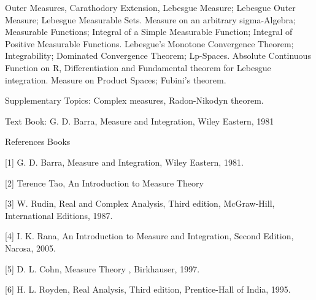 Outer Measures, Carathodory Extension, Lebesgue Measure; Lebesgue Outer Measure; Lebesgue Measurable Sets. Measure on an arbitrary sigma-Algebra; Measurable Functions; Integral of a Simple Measurable Function; Integral of Positive Measurable Functions. Lebesgue’s Monotone Convergence Theorem; Integrability; Dominated Convergence Theorem; Lp-Spaces. Absolute Continuous Function on R, Differentiation and Fundamental theorem for Lebesgue integration. Measure on Product Spaces;  Fubini’s theorem. 

Supplementary Topics: Complex measures, Radon-Nikodyn theorem.

Text Book: G. D. Barra, Measure and Integration, Wiley Eastern, 1981

References Books 

[1] G. D. Barra, Measure and Integration, Wiley Eastern, 1981. 

[2] Terence Tao, An Introduction to Measure Theory 

[3] W. Rudin, Real and Complex Analysis, Third edition, McGraw-Hill, International Editions, 1987.

[4] I. K. Rana, An Introduction to Measure and Integration, Second Edition, Narosa, 2005. 

[5] D. L. Cohn, Measure Theory , Birkhauser, 1997. 

[6] H. L. Royden, Real Analysis, Third edition, Prentice-Hall of India, 1995.
